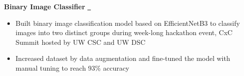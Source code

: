 \textbf{Binary Image Classifier} \href{https://github.com/ininicho/cxc_submission}{\github\ } \par
\begin{itemize}
	\item Built binary image classification model based on EfficientNetB3 to classify images into two distinct groups during week-long hackathon event, CxC Summit hosted by UW CSC and UW DSC
    \item Increased dataset by data augmentation and fine-tuned the model with manual tuning to reach 93\% accuracy
\end{itemize}
\vspace{0.1cm} \par
